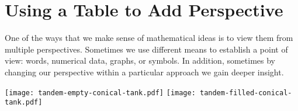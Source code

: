 \documentclass{ximera}
\begin{document}

\section{Using a Table to Add Perspective}

One of the ways that we make sense of mathematical ideas is to view them from multiple perspectives.  Sometimes we use different means to establish a point of view:  words, numerical data, graphs, or symbols.  In addition, sometimes by changing our perspective within a particular approach we gain deeper insight.%

\begin{image}
\texttt{[image: tandem-empty-conical-tank.pdf]}
\texttt{[image: tandem-filled-conical-tank.pdf]}
\end{image}
\end{document}
